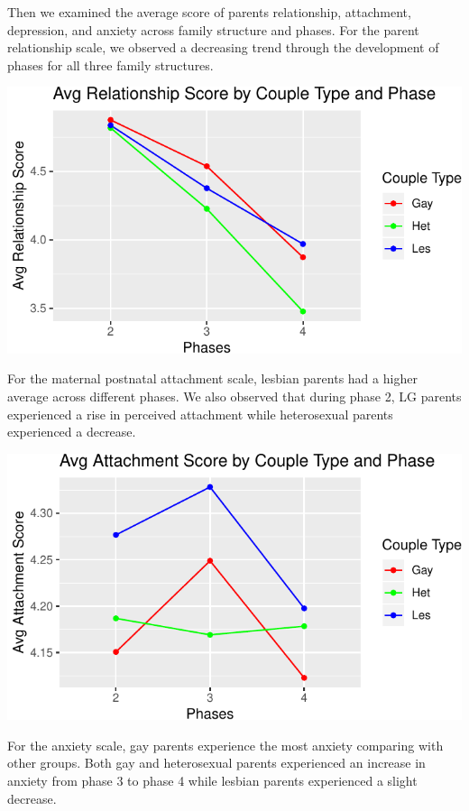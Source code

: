 \documentclass[man]{apa6}
\begin{document}
Then we examined the average score of parents relationship, attachment, depression, and anxiety across family structure and phases. For the parent relationship scale, we observed a decreasing trend through the development of phases for all three family structures.

\includegraphics{final_paper_files/figure-latex/fig1-1.pdf}

For the maternal postnatal attachment scale, lesbian parents had a higher average across different phases. We also observed that during phase 2, LG parents experienced a rise in perceived attachment while heterosexual parents experienced a decrease.

\includegraphics{final_paper_files/figure-latex/fig2-1.pdf}

For the anxiety scale, gay parents experience the most anxiety comparing with other groups. Both gay and heterosexual parents experienced an increase in anxiety from phase 3 to phase 4 while lesbian parents experienced a slight decrease.
\end{document}

